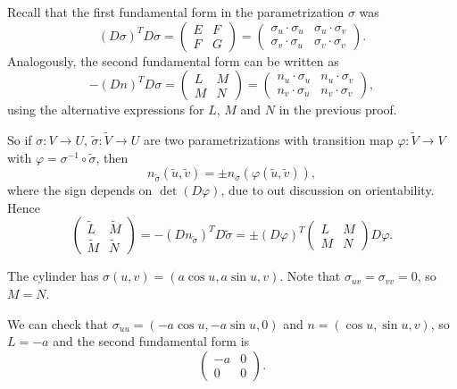 \documentclass[12pt]{article}
\begin{document}
Recall that the first fundamental form in the parametrization $\sigma$ was
\[
	(D \sigma)^{T} D \sigma =
	\begin{pmatrix}
		E & F \\
		F & G
	\end{pmatrix}
	=
	\begin{pmatrix}
		\sigma_u \cdot \sigma_u & \sigma_u \cdot \sigma_v \\
		\sigma_v \cdot \sigma_u & \sigma_v \cdot \sigma_v
	\end{pmatrix}
.\]
Analogously, the second fundamental form can be written as
\[
-(Dn)^{T} D \sigma =
\begin{pmatrix}
	L & M \\
	M & N
\end{pmatrix}
=
\begin{pmatrix}
	n_u \cdot \sigma_u & n_u \cdot \sigma_v \\
	n_v \cdot \sigma_u & n_v \cdot \sigma_v
\end{pmatrix}
,\]
using the alternative expressions for $L$, $M$ and $N$ in the previous proof.

So if $\sigma: V \to U$, $\tilde \sigma : \tilde V \to U$ are two parametrizations with transition map $\varphi : \tilde V \to V$ with $\varphi = \sigma^{-1} \circ \tilde \sigma$, then
\[
n_{\tilde \sigma}(\tilde u, \tilde v) = \pm n_{\sigma}(\varphi(\tilde u, \tilde v))
,\]
where the sign depends on $\det (D \varphi)$, due to out discussion on orientability. Hence
\[
\begin{pmatrix}
	\tilde L & \tilde M \\
	\tilde M & \tilde N
\end{pmatrix}
= - (D n_{\tilde \sigma})^{T}D \tilde \sigma = \pm (D \varphi)^{T}
\begin{pmatrix}
	L & M \\
	M & N
\end{pmatrix}
D \varphi
.\]

\begin{exbox}
	The cylinder has $\sigma(u, v) = (a \cos u, a \sin u, v)$. Note that $\sigma_{uv} = \sigma_{vv} = 0$, so $M = N$.
	
	We can check that $\sigma_{uu} = (-a \cos u, -a \sin u, 0)$ and $n = (\cos u, \sin u, v)$, so $L = -a$ and the second fundamental form is
	\[
	\begin{pmatrix}
		-a & 0 \\
		0 & 0
	\end{pmatrix}
	.\]
\end{exbox}
\end{document}
